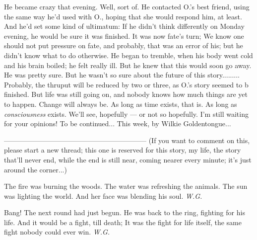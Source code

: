 He became crazy that evening. 
Well, sort of. 
He contacted O.'s best friend, using the same way he'd used with O., hoping that she would respond him, at least. 
And he'd set some kind of ultimatum: If he didn't think differently on Monday evening, he would be sure it was finished. It was now fate's turn; We know one should not put pressure on fate, and probably, that was an error of his; but he didn't know what to do otherwise. 
He began to tremble, when his body went cold and his brain boiled; he felt really ill. 
But he knew that this would soon go away. 
He was pretty sure. 
But he wasn't so sure about the future of this story.........
Probably, the thruput will be reduced by two or three, as O.'s story seemed to b finished. 
But life was still going on, and nobody knows how much things are yet to happen. 
Change will always be. 
As long as time exists, that is. 
As long as \emph{consciousness} exists. 
We'll see, hopefully --- or not so hopefully. 
I'm still waiting for your opinions!
To be continued...
This week, by Wilkie Goldentongue...

--------------------------------------------------------------
(If you want to comment on this, please start a new thread; this one is reserved for this story, my life, the story that'll never end, while the end is still near, coming nearer every minute; it's just around the corner...)

The fire was burning 
the woods. 
The water was refreshing 
the animals. 
The sun was lighting 
the world. 
And her face was blending 
his soul. 
\emph{W.G.}

Bang!
The next round had just begun. 
He was back to the ring, 
fighting for his life. 
And it would be a fight, 
till death; 
It was the fight 
for life itself, 
the same fight 
nobody could ever win. 
\emph{W.G.}

